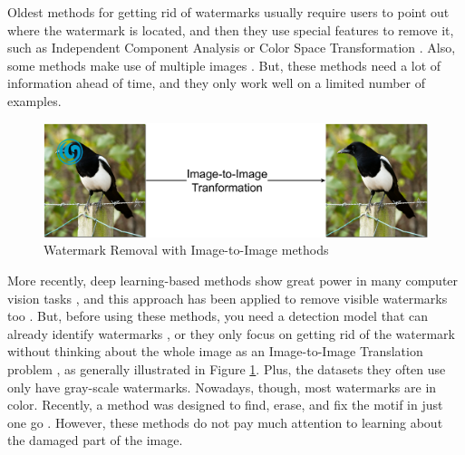 Oldest methods for getting rid of watermarks usually require users to point out where the watermark is located, and then they use special features to remove it, such as Independent Component Analysis \cite{pei2006novel} or Color Space Transformation \cite{park2012identigram}. Also, some methods make use of multiple images \cite{dekel2017effectiveness} \cite{gandelsman2019double}. But, these methods need a lot of information ahead of time, and they only work well on a limited number of examples.

\begin{figure}[H]
    \centering
    \includegraphics[width=0.75\linewidth]{img/watermark_removal_1.png}
    \caption{Watermark Removal with Image-to-Image methods}
    \label{figure:img2img1}
\end{figure}

More recently, deep learning-based methods show great power in many computer vision tasks \cite{he2016deep}, and this approach has been applied to remove visible watermarks too \cite{li2019towards} \cite{cheng2018large}  \cite{hertz2019blind}. But, before using these methods, you need a detection model that can already identify watermarks \cite{cheng2018large}, or they only focus on getting rid of the watermark without thinking about the whole image as an Image-to-Image Translation problem \cite{li2019towards}, as generally illustrated in Figure \ref{figure:img2img1}. Plus, the datasets they often use only have gray-scale watermarks. Nowadays, though, most watermarks are in color. Recently, a method was designed to find, erase, and fix the motif in just one go \cite{hertz2019blind}. However, these methods do not pay much attention to learning about the damaged part of the image.


